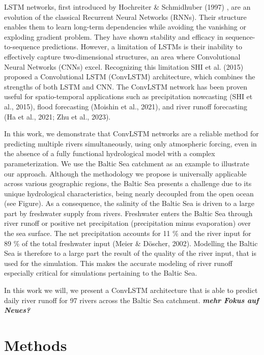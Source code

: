 \documentclass[
]{agujournal2019}
\begin{document}
LSTM networks, first introduced by Hochreiter \& Schmidhuber (1997) ,
are an evolution of the classical Recurrent Neural Networks (RNNs).
Their structure enables them to learn long-term dependencies while
avoiding the vanishing or exploding gradient problem. They have shown
stability and efficacy in sequence-to-sequence predictions. However, a
limitation of LSTMs is their inability to effectively capture
two-dimensional structures, an area where Convolutional Neural Networks
(CNNs) excel. Recognizing this limitation SHI et al. (2015) proposed a
Convolutional LSTM (ConvLSTM) architecture, which combines the strengths
of both LSTM and CNN. The ConvLSTM network has been proven useful for
spatio-temporal applications such as precipitation nowcasting (SHI et
al., 2015), flood forecasting (Moishin et al., 2021), and river runoff
forecasting (Ha et al., 2021; Zhu et al., 2023).

In this work, we demonstrate that ConvLSTM networks are a reliable
method for predicting multiple rivers simultaneously, using only
atmospheric forcing, even in the absence of a fully functional
hydrological model with a complex parameterization. We use the Baltic
Sea catchment as an example to illustrate our approach. Although the
methodology we propose is universally applicable across various
geographic regions, the Baltic Sea presents a challenge due to its
unique hydrological characteristics, being nearly decoupled from the
open ocean (see Figure). As a consequence, the salinity of the Baltic
Sea is driven to a large part by freshwater supply from rivers.
Freshwater enters the Baltic Sea through river runoff or positive net
precipitation (precipitation minus evaporation) over the sea surface.
The net precipitation accounts for 11 \% and the river input for 89 \%
of the total freshwater input (Meier \& Döscher, 2002). Modelling the
Baltic Sea is therefore to a large part the result of the quality of the
river input, that is used for the simulation. This makes the accurate
modeling of river runoff especially critical for simulations pertaining
to the Baltic Sea.

In this work we will, we present a ConvLSTM architecture that is able to
predict daily river runoff for 97 rivers across the Baltic Sea
catchment. \textbf{\emph{mehr Fokus auf Neues?}}

\section{Methods}\label{methods}
\end{document}
